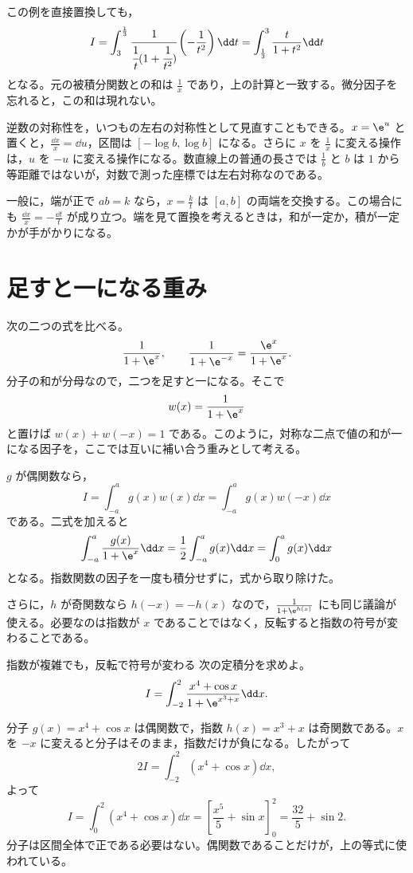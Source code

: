 この例を直接置換しても，
\[
I=\int_3^{\frac13}
\cfrac{1}{\cfrac1t(1+\cfrac1{t^2})}
\left(-\frac{1}{t^2}\right)\dd t
=\int_{\frac13}^3\frac{t}{1+t^2}\dd t
\]
となる。元の被積分関数との和は $\frac1x$ であり，上の計算と一致する。微分因子を忘れると，この和は現れない。

逆数の対称性を，いつもの左右の対称性として見直すこともできる。$x=\e^u$ と置くと，$\frac{\dd x}{x}=\dd u$，区間は $[-\log b,\log b]$ になる。さらに $x$ を $\frac1x$ に変える操作は，$u$ を $-u$ に変える操作になる。数直線上の普通の長さでは $\frac1b$ と $b$ は $1$ から等距離ではないが，対数で測った座標では左右対称なのである。

一般に，端が正で $ab=k$ なら，$x=\frac{k}{t}$ は $[a,b]$ の両端を交換する。この場合にも $\frac{\dd x}{x}=-\frac{\dd t}{t}$ が成り立つ。端を見て置換を考えるときは，和が一定か，積が一定かが手がかりになる。

\section{足すと一になる重み}\label{節:相補重み}

次の二つの式を比べる。
\[
\frac{1}{1+\e^x},\qquad
\frac{1}{1+\e^{-x}}=\frac{\e^x}{1+\e^x}.
\]
分子の和が分母なので，二つを足すと一になる。そこで
\[
w(x)=\frac{1}{1+\e^x}
\]
と置けば $w(x)+w(-x)=1$ である。このように，対称な二点で値の和が一になる因子を，ここでは互いに補い合う重みとして考える。

$g$ が偶関数なら，
\[
I=\int_{-a}^a g(x)w(x)\dd x
 =\int_{-a}^a g(x)w(-x)\dd x
\]
である。二式を加えると
\begin{equation}\label{式:偶関数と相補重み}
\int_{-a}^a\frac{g(x)}{1+\e^x}\dd x
 =\frac12\int_{-a}^a g(x)\dd x
 =\int_0^a g(x)\dd x
\end{equation}
となる。指数関数の因子を一度も積分せずに，式から取り除けた。

さらに，$h$ が奇関数なら $h(-x)=-h(x)$ なので，$\frac{1}{1+\e^{h(x)}}$ にも同じ議論が使える。必要なのは指数が $x$ であることではなく，反転すると指数の符号が変わることである。

\begin{example}{指数が複雑でも，反転で符号が変わる}
次の定積分を求めよ。
\[
I=\int_{-2}^2\frac{x^4+\cos x}{1+\e^{x^3+x}}\dd x.
\]
\end{example}

分子 $g(x)=x^4+\cos x$ は偶関数で，指数 $h(x)=x^3+x$ は奇関数である。$x$ を $-x$ に変えると分子はそのまま，指数だけが負になる。したがって
\[
2I=\int_{-2}^2(x^4+\cos x)\dd x,
\]
よって
\[
I=\int_0^2(x^4+\cos x)\dd x
 =\left[\frac{x^5}{5}+\sin x\right]_0^2
 =\frac{32}{5}+\sin2.
\]
分子は区間全体で正である必要はない。偶関数であることだけが，上の等式に使われている。

